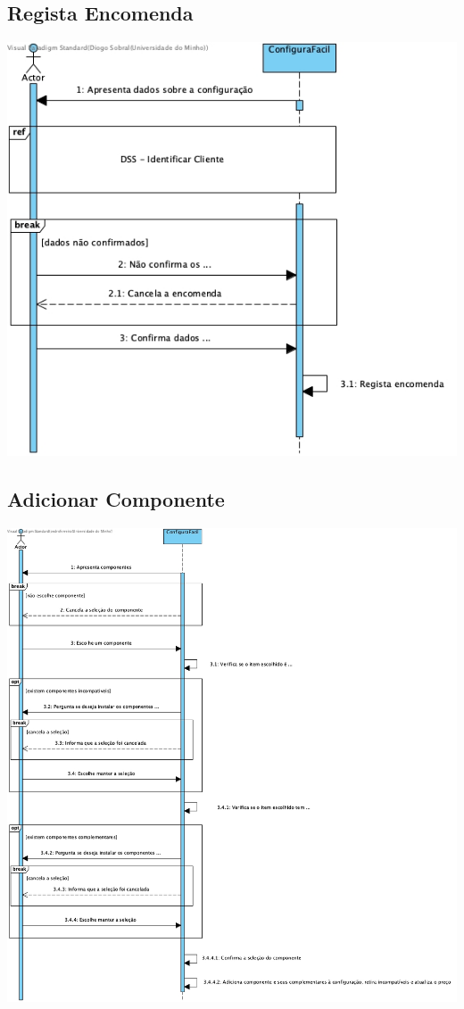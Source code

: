 \subsection{Regista Encomenda}
\begin{center}
 	\includegraphics[width = 5.5in]{DSS/DSS-Registar_Encomenda.jpg}
\end{center}

\subsection{Adicionar Componente}
\begin{center}
 	\includegraphics[width = 5.5in]{DSS/DSS-Adiciona_Componente.jpg}
\end{center}

